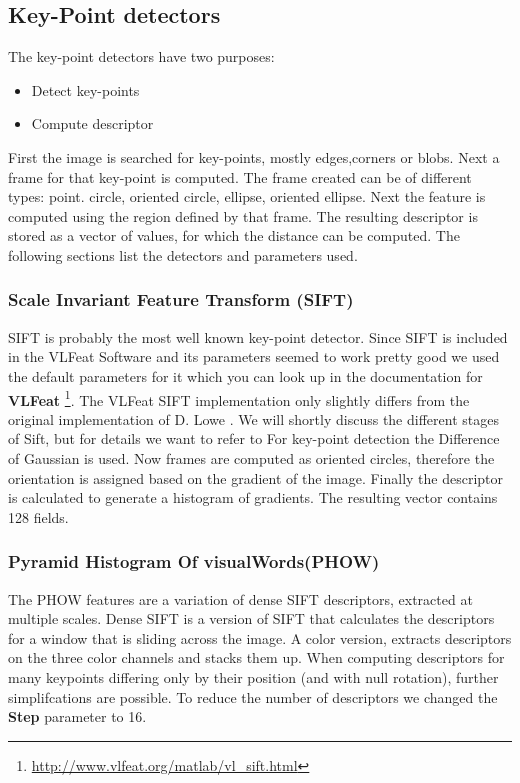 \documentclass[10pt,a4paper,twocolumn]{article}
\begin{document}
\subsection{Key-Point detectors}
The key-point detectors have two purposes:
\begin{itemize}
	\item Detect key-points
	\item Compute descriptor
\end{itemize}
First the image is searched for key-points, mostly edges,corners or blobs. Next a frame for that key-point  is computed. The frame created can be of different types: point. circle, oriented circle, ellipse, oriented ellipse. Next the feature is computed using the region defined by that frame. The resulting descriptor is stored as a vector of values, for which the distance can be computed. The following sections list the detectors and parameters used.

\subsubsection{Scale Invariant Feature Transform (SIFT)}
SIFT is probably the most well known key-point detector. Since SIFT is included in the VLFeat Software and its parameters seemed to work pretty good we used the default parameters for it which you can look up in the documentation for \textbf{VLFeat} \footnote{\url{http://www.vlfeat.org/matlab/vl_sift.html} }. The VLFeat SIFT implementation only slightly differs from the original implementation of D. Lowe \cite{lowe}. We will shortly discuss the different stages of Sift, but for details we want to refer to \cite{}For key-point detection the Difference of Gaussian is used. Now frames are computed as oriented circles, therefore the orientation is assigned based on the gradient of the image. Finally the descriptor is calculated to generate a histogram of gradients. The resulting vector contains 128 fields.

\subsubsection{Pyramid Histogram Of visualWords(PHOW)}
The PHOW \cite{phow} features are a variation of dense SIFT descriptors,
extracted at multiple scales. Dense SIFT is a version of SIFT that calculates the descriptors for a window that is sliding across the image. A color version, extracts descriptors
on the three color channels and stacks them up.
When computing descriptors for many keypoints differing only
by their position (and with null rotation), further
simplifcations are possible. To reduce the number of descriptors we changed the \textbf{Step} parameter to 16.
\end{document}
